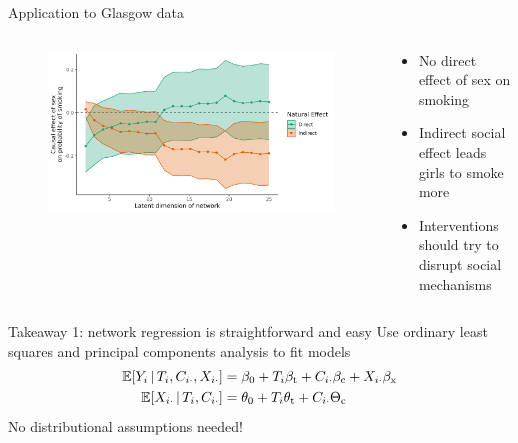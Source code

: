 \documentclass[aspectratio=169]{beamer}
\theoremstyle{remark}
\begin{document}
\begin{frame}{Application to Glasgow data}
    \begin{columns}
        \begin{column}{0.75\textwidth}
            \begin{figure}
                \includegraphics[width=1.05\textwidth]{figures/glasgow/effects.png}
            \end{figure}
        \end{column}
        \begin{column}{0.28\textwidth}
            \footnotesize
            \begin{itemize}
                \item No direct effect of sex on smoking
                \item Indirect social effect leads girls to smoke more
                \item Interventions should try to disrupt social mechanisms
            \end{itemize}
        \end{column}
    \end{columns}
\end{frame}

\begin{frame}{Takeaway 1: network regression is straightforward and easy}
    Use ordinary least squares and principal components analysis to fit models \\
    \begin{equation*}
        \begin{aligned}
            \E[T_i, C_{i \cdot}, \X_{i \cdot}]{Y_i}
             & = \betazero + T_i \betat + C_{i \cdot} \betac + \X_{i \cdot} \betax \\
            \E[T_i, C_{i \cdot}]{\X_{i \cdot}}
             & = \thetazero + T_i \thetat  + C_{i \cdot} \Thetac                   \\
        \end{aligned}
    \end{equation*}
    No distributional assumptions needed!
\end{frame}
\end{document}
